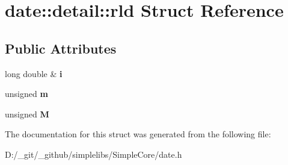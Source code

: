 \hypertarget{structdate_1_1detail_1_1rld}{}\section{date\+::detail\+::rld Struct Reference}
\label{structdate_1_1detail_1_1rld}
\subsection*{Public Attributes}
\begin{DoxyCompactItemize}
\item 
\mbox{\label{structdate_1_1detail_1_1rld_aa25e0e79bbb95a2c99d1537ad98ea0cb}} 
long double \& {\bfseries i}
\item 
\mbox{\label{structdate_1_1detail_1_1rld_a376391510721f5f3af2feae746452f3c}} 
unsigned {\bfseries m}
\item 
\mbox{\label{structdate_1_1detail_1_1rld_aed8160fcd23293e24eaf82ae6d7b0363}} 
unsigned {\bfseries M}
\end{DoxyCompactItemize}


The documentation for this struct was generated from the following file\+:\begin{DoxyCompactItemize}
\item 
D\+:/\+\_\+git/\+\_\+github/simplelibs/\+Simple\+Core/date.\+h\end{DoxyCompactItemize}
